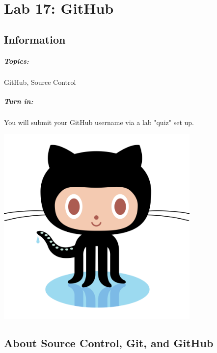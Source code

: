 \documentclass[a4paper,12pt,oneside]{book}
\title{}
\author{Rachel Morris}
\date{\today}
\newcommand{\laLab}{Lab 17: GitHub\ }
\begin{document}
    \chapter*{\laLab} 

        \section{Information}
            \paragraph{ Topics: } GitHub, Source Control
            \paragraph{ Turn in: } You will submit your GitHub username via a lab "quiz" set up.


        \begin{center}
            \includegraphics[width=10cm]{images/octocat.png}
        \end{center}

        \tableofcontents
            

    \newpage

    \section{About Source Control, Git, and GitHub}
\end{document}
